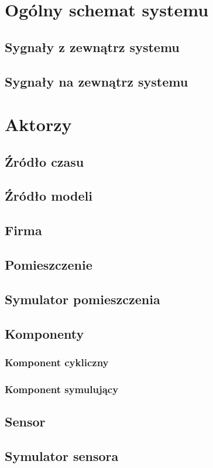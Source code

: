 \chapter{Ogólny schemat systemu}
\section{Sygnały z zewnątrz systemu} 
\section{Sygnały na zewnątrz systemu}

\chapter{Aktorzy}
\section{Źródło czasu}
\section{Źródło modeli}
\section{Firma}
\section{Pomieszczenie}
\section{Symulator pomieszczenia}

\section{Komponenty}
\subsection{Komponent cykliczny}
\subsection{Komponent symulujący}
\section{Sensor}
\section{Symulator sensora}
